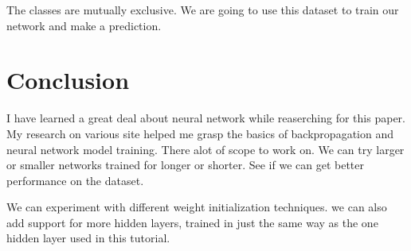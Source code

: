 \documentclass[12pt]{article}
\begin{document}
The classes are mutually exclusive. We are going to use this dataset to train our network and make a prediction.


\section{Conclusion}


I have learned a great deal about neural network while reaserching for this paper. My research on various site helped me grasp the basics of backpropagation and neural network model training. There alot of scope to work on. We can try larger or smaller networks trained for longer or shorter. See if we can get better performance on the dataset.\cite{ARTICLE:1}

We can experiment with different weight initialization techniques. we can also add support for more hidden layers, trained in just the same way as the one hidden layer used in this tutorial.



\end{document}
